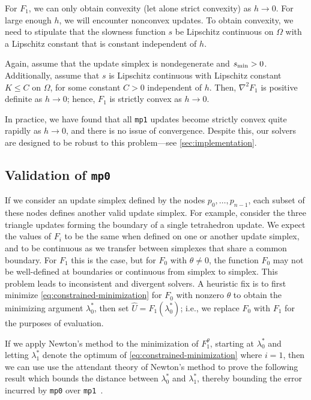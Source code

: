 \documentclass[sisc-eikonal.tex]{subfiles}
\begin{document}
For $F_1$, we can only obtain convexity (let alone strict convexity)
as $h \to 0$. For large enough $h$, we will encounter nonconvex
updates. To obtain convexity, we need to stipulate that the slowness
function $s$ be Lipschitz continuous on $\Omega$ with a Lipschitz
constant that is constant independent of $h$.

\begin{lemma}\label{lemma:F-strictly-convex}
  Again, assume that the update simplex is nondegenerate and
  $s_{\operatorname{min}} > 0$. Additionally, assume that $s$ is Lipschitz continuous
  with Lipschitz constant $K \leq C$ on $\Omega$, for some constant
  $C > 0$ independent of $h$. Then, $\nabla^2 F_1$ is positive
  definite as $h \to 0$; hence, $F_1$ is strictly convex as $h \to 0$.
\end{lemma}

In practice, we have found that all \texttt{mp1} updates become
strictly convex quite rapidly as $h \to 0$, and there is no issue of
convergence. Despite this, our solvers are designed to be robust to
this problem---see \cref{sec:implementation}.

\subsection{Validation of \texttt{mp0}}\label{ssec:validation}

If we consider an update simplex defined by the nodes
$p_0, \hdots, p_{n-1}$, each subset of these nodes defines another
valid update simplex. For example, consider the three triangle updates
forming the boundary of a single tetrahedron update. We expect the
values of $F_i$ to be the same when defined on one or another update
simplex, and to be continuous as we transfer between simplexes that
share a common boundary. For $F_1$ this is the case, but for $F_0$
with $\theta \neq 0$, the function $F_0$ may not be well-defined at
boundaries or continuous from simplex to simplex. This problem leads
to inconsistent and divergent solvers. A heuristic fix is to first
minimize \cref{eq:constrained-minimization} for $F_0$ with nonzero
$\theta$ to obtain the minimizing argument $\lambda^*_0$, then set
$\hat{U} = F_1(\lambda_0^*)$; i.e., we replace $F_0$ with $F_1$ for
the purposes of evaluation.

If we apply Newton's method to the minimization of $F_1^\theta$,
starting at $\lambda_0^*$ and letting $\lambda_1^*$ denote the optimum
of \cref{eq:constrained-minimization} where $i = 1$, then we can use
use the attendant theory of Newton's method to prove the following
result which bounds the distance between $\lambda_0^*$ and
$\lambda_1^*$, thereby bounding the error incurred by \texttt{mp0}
over \texttt{mp1}~\cite{stoer2013introduction}.
\end{document}
